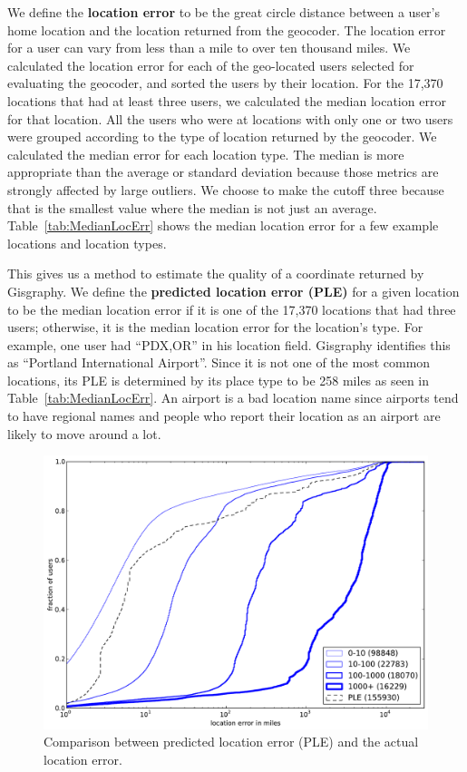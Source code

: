 We define the \textbf{location error} to be the great circle distance between a
user's home location and the location returned from the geocoder.
%
The location error for a user can vary from less than a mile to over ten
thousand miles.
%
We calculated the location error for each of the geo-located users selected for
evaluating the geocoder, and sorted the users by their location.
%
For the 17,370 locations that had at least three users, we calculated the median
location error for that location.
%
All the users who were at locations with only one or two users were grouped
according to the type of location returned by the geocoder.
%
We calculated the median error for each location type.
%
The median is more appropriate than the average or standard deviation because
those metrics are strongly affected by large outliers.
%
We choose to make the cutoff three because that is the smallest value where the
median is not just an average.
Table~\ref{tab:MedianLocErr} shows the median location error for a few example
locations and location types.

This gives us a method to estimate the quality of a coordinate returned by
Gisgraphy.
%
We define the \textbf{predicted location error (PLE)} for a given location to
be the median location error if it is one of the 17,370 locations that had
three users; otherwise, it is the median location error for the location's
type.
%
For example, one user had ``PDX,OR'' in his location field.
%
Gisgraphy identifies this as ``Portland International Airport''.
%
Since it is not one of the most common locations, its PLE is determined by its
place type to be 258 miles as seen in Table~\ref{tab:MedianLocErr}.
%
An airport is a bad location name since airports tend to have regional names
and people who report their location as an airport are likely to move around a
lot.

\begin{figure}[tb]
\centering
\includegraphics[width=\linewidth]{figures/mloc_mdist.pdf}
\caption{
Comparison between predicted location error (PLE) and the actual location error.
}
\label{fig:DiffMlocMdist}
\end{figure}

